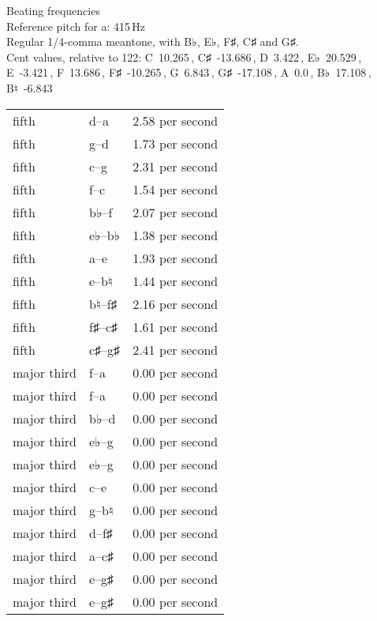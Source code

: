\documentclass{standalone}
\def\str{\textquotesingle}
\def\cn{\textcent}
\begin{document}
\begin{minipage}{8cm}
\begin{center}
  {\Large Beating frequencies}\\[2ex]
  Reference pitch for a\str: 415\,Hz\\[1ex]
  Regular 1/4-comma meantone, with B♭, E♭, F♯, C♯ and G♯.\\[1ex]
  Cent values, relative to 122: C~10.265\,\cn, C♯~-13.686\,\cn, D~3.422\,\cn, E♭~20.529\,\cn, E~-3.421\,\cn, F~13.686\,\cn, F♯~-10.265\,\cn, G~6.843\,\cn, G♯~-17.108\,\cn, A~0.0\,\cn, B♭~17.108\,\cn, B♮~-6.843\,\cn
\end{center}
\begin{longtable}{p{2cm}p{1cm}p{3cm}}
  \toprule
  fifth & d\str--a\str & 2.58 per second \\fifth & g--d\str & 1.73 per second \\fifth & c\str--g\str & 2.31 per second \\fifth & f--c\str & 1.54 per second \\fifth & b♭--f\str & 2.07 per second \\fifth & e♭--b♭ & 1.38 per second \\fifth & a--e\str & 1.93 per second \\fifth & e--b♮ & 1.44 per second \\fifth & b♮--f♯\str & 2.16 per second \\fifth & f♯--c♯\str & 1.61 per second \\fifth & c♯\str--g♯\str & 2.41 per second \\major third & f\str--a\str & 0.00 per second \\major third & f--a & 0.00 per second \\major third & b♭--d\str & 0.00 per second \\major third & e♭--g & 0.00 per second \\major third & e♭\str--g\str & 0.00 per second \\major third & c\str--e\str & 0.00 per second \\major third & g--b♮ & 0.00 per second \\major third & d\str--f♯\str & 0.00 per second \\major third & a--c♯\str & 0.00 per second \\major third & e\str--g♯\str & 0.00 per second \\major third & e--g♯ & 0.00 per second \\
  \bottomrule
\end{longtable}
\end{minipage}
\end{document}
